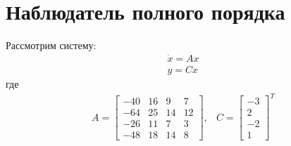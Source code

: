 \section{Наблюдатель полного порядка}
Рассмотрим систему:
\begin{equation}
    \begin{array}{ll}
        \dot{x} = Ax\\
        y = Cx
    \end{array}
\end{equation}
где
\begin{equation}
    \begin{array}{ccc}
        A = \begin{bmatrix}
            -40 & 16 & 9 & 7 \\ 
            -64 & 25 & 14 & 12 \\ 
            -26 & 11 & 7 & 3 \\ 
            -48 & 18 & 14 & 8
        \end{bmatrix}, & 
        C = \begin{bmatrix}
            -3 \\ 2 \\ -2 \\ 1
        \end{bmatrix}^T
    \end{array}
\end{equation}
